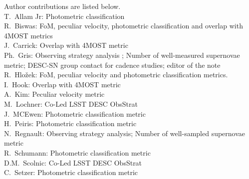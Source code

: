 Author contributions are listed below. \\
T.~Allam Jr: Photometric classification \\
R.~Biswas: FoM, peculiar velocity, photometric classification and overlap with 4MOST metrics \\
J.~Carrick: Overlap with 4MOST metric \\
Ph.~Gris: Observing strategy analysis ; Number of well-measured supernovae metric; DESC-SN group contact for cadence studies; editor of the note \\
R.~Hlo\v{z}ek: FoM, peculiar velocity and photometric classification metrics. \\
I.~Hook: Overlap with 4MOST metric \\
A.~Kim: Peculiar velocity metric \\
M.~Lochner: Co-Led LSST DESC ObsStrat \\
J.~MCEwen: Photometric classification metric \\
H.~Peiris: Photometric classification metric \\
N.~Regnault: Observing strategy analysis; Number of well-sampled supernovae metric \\
R.~Schumann: Photometric classification metric \\
D.M.~Scolnic: Co-Led LSST DESC ObsStrat \\
C.~Setzer: Photometric classification metric \\
